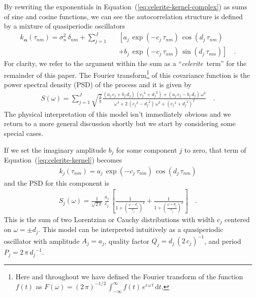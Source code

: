 \documentclass[manuscript, letterpaper]{aastex6}
\newcommand{\celeriteterm}{\emph{celerite}}
\renewcommand{\eqref}[1]{\ref{eq:#1}}
\newcommand{\Eq}[1]{Equation~(\eqref{#1})}
\newcommand{\eq}[1]{\Eq{#1}}
\newcommand{\eqlabel}[1]{\label{eq:#1}}
\newcommand{\dd}{\ensuremath{\,\mathrm{d}}}
\newcommand{\bvec}[1]{{\ensuremath{\boldsymbol{#1}}}}
\begin{document}
By rewriting the exponentials in \eq{celerite-kernel-complex} as sums of sine
and cosine functions, we can see the autocorrelation structure is defined by a
mixture of quasiperiodic oscillators
\begin{eqnarray}\eqlabel{celerite-kernel}
k_\bvec{\alpha}(\tau_{nm}) = \sigma_n^2\,\delta_{nm} +
    \sum_{j=1}^J &&\left[
    a_j\,\exp\left(-c_j\,\tau_{nm}\right)\,\cos\left(d_j\,\tau_{nm}\right)
        \right.\nonumber\\
    &&+ \left.
    b_j\,\exp\left(-c_j\,\tau_{nm}\right)\,\sin\left(d_j\,\tau_{nm}\right)
\right] \quad.
\end{eqnarray}
For clarity, we refer to the argument within the sum as a ``\celeriteterm\
term'' for the remainder of this paper.
The Fourier transform\footnote{Here and throughout we have defined the Fourier
transform of the function $f(t)$ as $F(\omega)={(2\,\pi)}^{-1/2}\,
\int_{-\infty}^\infty f(t)\,e^{i\,\omega\,t}\dd t$.} of this covariance
function is the power spectral density (PSD) of the process and it is given by
\begin{eqnarray}\eqlabel{celerite-psd}
S(\omega) = \sum_{j=1}^J \sqrt{\frac{2}{\pi}}
\frac{(a_j\,c_j+b_j\,d_j)\,({c_j}^2+{d_j}^2)+(a_j\,c_j-b_j\,d_j)\,\omega^2}
{\omega^4+2\,({c_j}^2-{d_j}^2)\,\omega^2+{({c_j}^2+{d_j}^2)}^2}\quad.
\end{eqnarray}
The physical interpretation of this model isn't immediately obvious and we
return to a more general discussion shortly but we start by considering some
special cases.

If we set the imaginary amplitude $b_j$ for some component $j$ to zero, that
term of \eq{celerite-kernel} becomes
\begin{eqnarray}
k_j(\tau_{nm}) =
    a_j\,\exp\left(-c_j\,\tau_{nm}\right)\,\cos\left(d_j\,\tau_{nm}\right)
\end{eqnarray}
and the PSD for this component is
\begin{eqnarray}\eqlabel{lorentz-psd}
S_j(\omega) = \frac{1}{\sqrt{2\,\pi}}\,\frac{a_j}{c_j}\,\left[
    \frac{1}{1+{\left(\frac{\omega-d_j}{c_j}\right)}^2} +
    \frac{1}{1+{\left(\frac{\omega+d_j}{c_j}\right)}^2}
\right] \quad.
\end{eqnarray}
This is the sum of two Lorentzian or Cauchy distributions with width $c_j$
centered on $\omega = \pm d_j$.
This model can be interpreted intuitively as a quasiperiodic oscillator with
amplitude $A_j = a_j$, quality factor $Q_j = d_j\,{(2\,c_j)}^{-1}$, and period
$P_j = 2\,\pi\,{d_j}^{-1}$.
\end{document}
